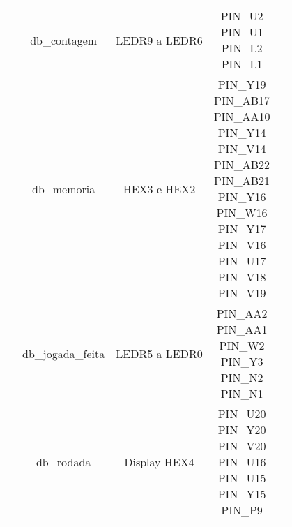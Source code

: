 \documentclass[amsmath,amssymb,floatfix]{report}
\begin{document}
\begin{table}[H]
\begin{tabular}{c|c|c|c|c|}
\multicolumn{1}{|c|}{}                           & db\_contagem            & LEDR9 a LEDR6        & \thead{PIN\_U2\\ PIN\_U1\\ PIN\_L2\\ PIN\_L1}                                                                                                                                         & \multicolumn{1}{l|}{}          \\ \cline{2-5} 
\multicolumn{1}{|c|}{}                           & db\_memoria             & HEX3 e HEX2          & \thead{PIN\_Y19 \\ PIN\_AB17 \\ PIN\_AA10 \\  PIN\_Y14 \\ PIN\_V14 \\  PIN\_AB22 \\  PIN\_AB21 \\PIN\_Y16 \\ PIN\_W16 \\ PIN\_Y17 \\ PIN\_V16 \\ PIN\_U17 \\ PIN\_V18 \\ PIN\_V19 \\} & \multicolumn{1}{l|}{}          \\ \cline{2-5} 
\multicolumn{1}{|c|}{}                           & db\_jogada\_feita       & LEDR5 a LEDR0        & \thead{PIN\_AA2\\ PIN\_AA1\\ PIN\_W2\\ PIN\_Y3\\ PIN\_N2\\ PIN\_N1}                                                                                                                   & \multicolumn{1}{l|}{}          \\ \cline{2-5} 
\multicolumn{1}{|c|}{}                           & db\_rodada              & Display HEX4         & \thead{PIN\_U20\\ PIN\_Y20\\ PIN\_V20\\ PIN\_U16\\ PIN\_U15\\ PIN\_Y15\\ PIN\_P9}                                                                                                     & \multicolumn{1}{l|}{}          \\ \cline{2-5} 

\end{tabular}
\end{table}
\end{document}
